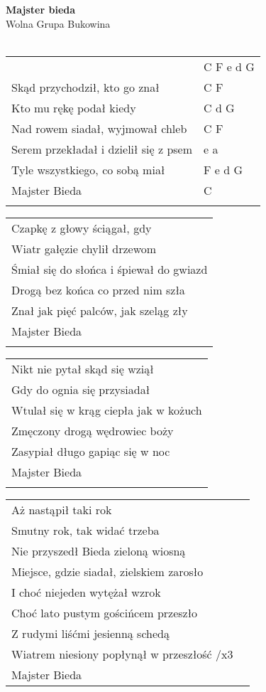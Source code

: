 \documentclass[a5paper]{article}
\begin{document}


\noindent
\fontsize{12pt}{15pt}\selectfont
\textbf{Majster bieda} \\
\fontsize{8pt}{10pt}\selectfont
Wolna Grupa Bukowina \\ \\
\fontsize{10pt}{12pt}\selectfont
{}
\begin{tabular}{@{}p{8.00cm}p{3cm}@{}}
\noindent
& C F e d G \\
Skąd przychodził, kto go znał & C F \\
Kto mu rękę podał kiedy & C d G \\
Nad rowem siadał, wyjmował chleb & C F \\
Serem przekładał i dzielił się z psem & e a \\
Tyle wszystkiego, co sobą miał & F e d G \\
Majster Bieda & C \\ \\
\end{tabular}

\noindent
\begin{tabular}{@{}p{8.00cm}@{}}
Czapkę z głowy ściągał, gdy \\
Wiatr gałęzie chylił drzewom \\
Śmiał się do słońca i śpiewał do gwiazd \\
Drogą bez końca co przed nim szła \\
Znał jak pięć palców, jak szeląg zły \\
Majster Bieda \\ \\
\end{tabular}

\noindent
\begin{tabular}{@{}p{8.00cm}@{}}
Nikt nie pytał skąd się wziął \\
Gdy do ognia się przysiadał \\
Wtulał się w krąg ciepła jak w kożuch \\
Zmęczony drogą wędrowiec boży \\
Zasypiał długo gapiąc się w noc \\
Majster Bieda \\ \\
\end{tabular}

\noindent
\begin{tabular}{@{}p{8.00cm}p{3cm}@{}}
Aż nastąpił taki rok & \\
Smutny rok, tak widać trzeba & \\
Nie przyszedł Bieda zieloną wiosną & \\
Miejsce, gdzie siadał, zielskiem zarosło & \\
I choć niejeden wytężał wzrok & \\
Choć lato pustym gościńcem przeszło & \\
Z rudymi liśćmi jesienną schedą & \\
Wiatrem niesiony popłynął w przeszłość /x3 & \\
Majster Bieda
\end{tabular}
\end{document}
